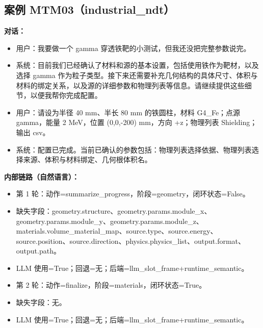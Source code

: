 \documentclass[11pt]{ctexart}
\begin{document}
\subsection{案例 MTM03（industrial\_ndt）}
\textbf{对话：}
\begin{itemize}
\item 用户：我要做一个 gamma 穿透铁靶的小测试，但我还没把完整参数说完。
\item 系统：目前我们已经确认了材料和源的基本设置，包括使用铁作为靶材，以及选择 gamma 作为粒子类型。接下来还需要补充几何结构的具体尺寸、体积与材料的绑定关系，以及源的详细参数和物理列表等信息。请继续提供这些细节，以便我帮你完成配置。
\item 用户：请设为半径 40 mm、半长 80 mm 的铁圆柱，材料 G4\_Fe；点源 gamma，能量 2 MeV，位置 (0,0,-200) mm，方向 +z；物理列表 Shielding；输出 csv。
\item 系统：配置已完成。当前已确认的参数包括：物理列表选择依据、物理列表选择来源、体积与材料绑定、几何根体积名。
\end{itemize}
\textbf{内部链路（自然语言）：}
\begin{itemize}
\item 第 1 轮：动作=summarize\_progress，阶段=geometry，闭环状态=False。
\item 缺失字段：geometry.structure、geometry.params.module\_x、geometry.params.module\_y、geometry.params.module\_z、materials.volume\_material\_map、source.type、source.energy、source.position、source.direction、physics.physics\_list、output.format、output.path。
\item LLM 使用=True；回退=无；后端=llm\_slot\_frame+runtime\_semantic。
\item 第 2 轮：动作=finalize，阶段=materials，闭环状态=True。
\item 缺失字段：无。
\item LLM 使用=True；回退=无；后端=llm\_slot\_frame+runtime\_semantic。
\end{itemize}
\end{document}
